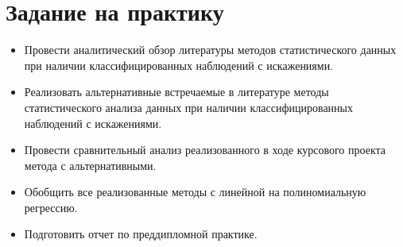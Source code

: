 \section{Задание на практику}
\begin{itemize}
    \item Провести аналитический обзор литературы методов статистического данных при наличии классифицированных наблюдений с искажениями.
    \item Реализовать альтернативные встречаемые в литературе методы статистического анализа данных при наличии классифицированных наблюдений с искажениями.
    \item Провести сравнительный анализ реализованного в ходе курсового проекта метода с альтернативными.
    \item Обобщить все реализованные методы с линейной на полиномиальную регрессию.
    \item Подготовить отчет по преддипломной практике.
\end{itemize}